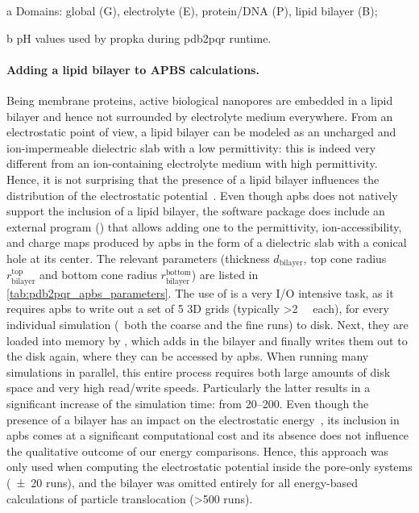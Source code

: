 {\begin{landscape}
\begin{threeparttable}[p]
    \begin{tablenotes}
     \item[a] Domains: global (G), electrolyte (E), protein/DNA (P), lipid bilayer (B);
     \item[b] pH values used by \gls{propka} during \gls{pdb2pqr} runtime.
    \end{tablenotes}
  
  \end{threeparttable}
\end{landscape}
}
%
%

\paragraph{Adding a lipid bilayer to APBS calculations.}
%
Being membrane proteins, active biological nanopores are embedded in a lipid bilayer and hence not surrounded
by electrolyte medium everywhere. From an electrostatic point of view, a lipid bilayer can be modeled as an
uncharged and ion-impermeable dielectric slab with a low permittivity: this is indeed very different from an
ion-containing electrolyte medium with high permittivity. Hence, it is not surprising that the presence of a
lipid bilayer influences the distribution of the electrostatic potential~\cite{Homeyer-2015}. Even though
\Gls{apbs} does not natively support the inclusion of a lipid bilayer, the software package does include an
external program () that allows adding one to the permittivity, ion-accessibility, and
charge maps produced by \gls{apbs} in the form of a dielectric slab with a conical hole at its center. The
relevant parameters (thickness $d_{\textrm{bilayer}}$, top cone radius $r_{\textrm{bilayer}}^{\textrm{top}}$
and bottom cone radius $r_{\textrm{bilayer}}^{\textrm{bottom}}$) are listed in
\cref{tab:pdb2pqr_apbs_parameters}. The use of  is a very I/O intensive task, as it
requires \gls{apbs} to write out a set of 5 3D grids (typically \SI{>2}{\gibi\byte} each), for every
individual simulation (\ie~both the coarse and the fine runs) to disk. Next, they are loaded into memory by
, which adds in the bilayer and finally writes them out to the disk again, where they
can be accessed by \gls{apbs}. When running many simulations in parallel, this entire process requires both
large amounts of disk space and very high read/write speeds. Particularly the latter results in a significant
increase of the simulation time: from \SIrange{20}{200}{\min}. Even though the presence of a bilayer has an
impact on the electrostatic energy~\cite{Bonthuis-2006}, its inclusion in \gls{apbs} comes at a significant
computational cost and its absence does not influence the qualitative outcome of our energy comparisons.
Hence, this approach was only used when computing the electrostatic potential inside the pore-only systems
(\num{\pm20} runs), and the bilayer was omitted entirely for all energy-based calculations of particle
translocation (\num{>500} runs).  


